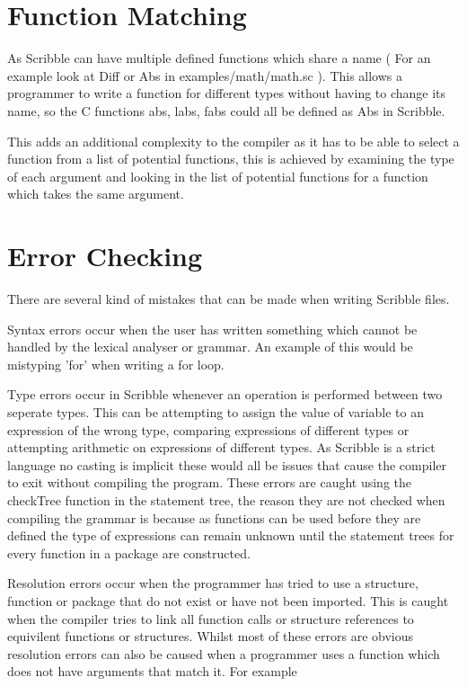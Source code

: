 \documentclass[]{final_report}
\begin{document}
\section{Function Matching}

As Scribble can have multiple defined functions which share a name ( For an example look at Diff or Abs in examples/math/math.sc ). This allows a programmer to write a function for different types without having to change its name, so the C functions abs, labs, fabs could all be defined as Abs in Scribble.

This adds an additional complexity to the compiler as it has to be able to select a function from a list of potential functions, this is achieved by examining the type of each argument and looking in the list of potential functions for a function which takes the same argument. 

\section{Error Checking}

There are several kind of mistakes that can be made when writing Scribble files. 

Syntax errors occur when the user has written something which cannot be handled by the lexical analyser or grammar. An example of this would be mistyping 'for' when writing a for loop. 

Type errors occur in Scribble whenever an operation is performed between two seperate types. This can be attempting to assign the value of variable to an expression of the wrong type, comparing expressions of different types or attempting arithmetic on expressions of different types. As Scribble is a strict language no casting is implicit these would all be issues that cause the compiler to exit without compiling the program. These errors are caught using the checkTree function in the statement tree, the reason they are not checked when compiling the grammar is because as functions can be used before they are defined the type of expressions can remain unknown until the statement trees for every function in a package are constructed.

Resolution errors occur when the programmer has tried to use a structure, function or package that do not exist or have not been imported. This is caught when the compiler tries to link all function calls or structure references to equivilent functions or structures. Whilst most of these errors are obvious resolution errors can also be caused when a programmer uses a function which does not have arguments that match it. For example
 
\end{document}
